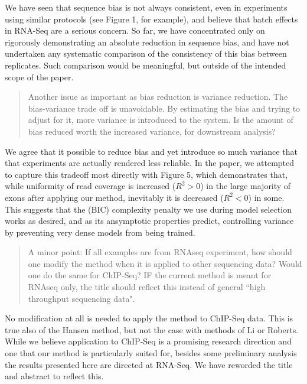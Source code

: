 \documentclass{article}
\begin{document}
We have seen that sequence bias is not always consistent, even in experiments
using similar protocols (see Figure 1, for example), and believe that batch
effects in RNA-Seq are a serious concern. So far, we have concentrated only on
rigorously demonstrating an absolute reduction in sequence bias, and have not
undertaken any systematic comparison of the consistency of this bias between
replicates. Such comparison would be meaningful, but outside of the intended
scope of the paper.


\begin{quote}
Another issue as important as bias reduction is variance reduction. The
bias-variance trade off is unavoidable. By estimating the bias and trying to
adjust for it, more variance is introduced to the system. Is the amount of bias
reduced worth the increased variance, for downstream analysis?
\end{quote}

We agree that it possible to reduce bias and yet introduce so much variance that
that experiments are actually rendered less reliable. In the paper, we attempted
to capture this tradeoff most directly with Figure 5, which demonstrates that,
while uniformity of read coverage is increased ($R^2 > 0$) in the large majority
of exons after applying our method, inevitably it is decreased ($R^2 < 0$) in
some. This suggests that the (BIC) complexity penalty we use during model
selection works as desired, and as its ansymptotic properties predict,
controlling variance by preventing very dense models from being trained.


\begin{quote}
A minor point: If all examples are from RNAseq experiment, how should
one modify the method when it is applied to other sequencing data?
Would one do the same for ChIP-Seq? IF the current method is meant for
RNAseq only, the title should reflect this instead of general ``high
throughput sequencing data".
\end{quote}

No modification at all is needed to apply the method to ChIP-Seq data. This is
true also of the Hansen method, but not the case with methods of Li or Roberts.
While we believe application to ChIP-Seq is a promising research direction and
one that our method is particularly suited for, besides some preliminary
analysis the results presented here are directed at RNA-Seq. We have
reworded the title and abstract to reflect this.
\end{document}
